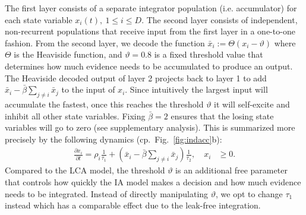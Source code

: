 \documentclass[10pt,letterpaper]{article}
\begin{document}
The first layer consists of a separate integrator population (i.e. accumulator) for each state variable $x_i(t), \ 1 \leq i \leq D$.
The second layer consists of independent, non-recurrent populations that receive input from the first layer in a one-to-one fashion.
From the second layer, we decode the function $\bar{x}_i := \Theta(x_i - \vartheta)$ where $\Theta$ is the Heaviside function, and $\vartheta = 0.8$ is a fixed threshold value that determines how much evidence needs to be accumulated to produce an output.
The Heaviside decoded output of layer 2 projects back to layer 1 to add $\bar{x}_i - \bar{\beta} \sum_{j \neq i} \bar{x}_j$ to the input of $x_i$.
Since intuitively the largest input will accumulate the fastest, once this reaches the threshold $\vartheta$ it will self-excite and inhibit all other state variables.
Fixing $\bar{\beta} = 2$ ensures that the losing state variables will go to zero (see supplementary analysis).
This is summarized more precisely by the following dynamics (cp.~Fig.~\ref{fig:indacc}b):
\begin{equation}
    \begin{split}
        \frac{{\partial x}_i}{\partial t} = \rho_i \frac{1}{\tau_1} + \left( 
            \bar{x}_i - \bar{\beta} \sum_{j \neq i} \bar{x}_j \right) \frac{1}{\tau_2} , \quad x_i &\ge 0 .
    \end{split}
\end{equation}
Compared to the LCA model, the threshold $\vartheta$ is an additional free parameter that controls how quickly the IA model makes a decision and how much evidence needs to be integrated.
Instead of directly manipulating $\vartheta$, we opt to change $\tau_1$ instead which has a comparable effect due to the leak-free integration.
\end{document}

